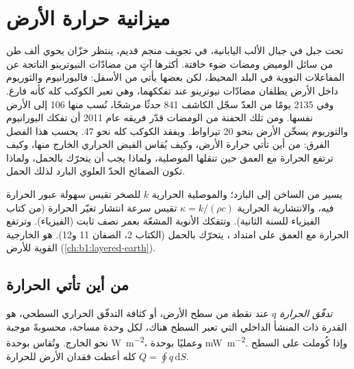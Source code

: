 \chapter{ميزانية حرارة الأرض}\label{ch:b1:heat-budget}

تحت جبل في جبال الألب اليابانية، في تجويف منجم قديم، ينتظر خزّان يحوي ألف طن من سائل الوميض ومضات ضوء خافتة. أكثرها آتٍ من مضادّات النيوترينو الناتجة عن المفاعلات النووية في البلد المحيط، لكن بعضها يأتي من الأسفل: فاليورانيوم والثوريوم داخل الأرض يطلقان مضادّات نيوترينو عند تفككهما، وهي تعبر الكوكب كله كأنه فارغ. وفي 2135 يومًا من العدّ سجّل الكاشف 841 حدثًا مرشحًا، نُسب منها 106 إلى الأرض نفسها. ومن تلك الحفنة من الومضات قدّر فريقه عام 2011 أن تفكك اليورانيوم والثوريوم يسخّن الأرض بنحو 20 تيراواط. ويفقد الكوكب كله نحو 47. يحسب هذا الفصل الفرق: من أين تأتي حرارة الأرض، وكيف يُقاس الفيض الحراري الخارج منها، وكيف ترتفع الحرارة مع العمق حين تنقلها الموصلية، ولماذا يجب أن يتحرّك  بالحمل، ولماذا تكون الصفائح الحدّ العلوي البارد لذلك الحمل.

\begin{recall}
يسير  من الساخن إلى البارد؛ والموصلية الحرارية $k$ للصخر تقيس سهولة عبور الحرارة فيه، والانتشارية الحرارية $\kappa = k/(\rho c)$ تقيس سرعة انتشار تغيّر الحرارة (من كتاب الفيزياء للسنة الثانية). وتتفكك الأنوية المشعّة بعمر نصف ثابت (الفيزياء). وترتفع الحرارة مع العمق على امتداد ،  يتحرّك بالحمل (الكتاب 2، الصفان 11 و\num{12}).  هو  الخارجية القوية للأرض (\cref{ch:b1:layered-earth}).
\end{recall}

\section{من أين تأتي الحرارة}

\begin{definition}\label{def:b1:heat-budget:heat-flow}
\emph{تدفّق الحرارة} $q$ عند نقطة من سطح الأرض، أو كثافة التدفّق الحراري السطحي، هو القدرة ذات المنشأ الداخلي التي تعبر السطح هناك، لكل وحدة مساحة، محسوبةً موجبة نحو الخارج. وتُقاس بوحدة \unit{W.m^{-2}}، وعمليًا بوحدة \unit{mW.m^{-2}}. وإذا كُوملت على السطح كله أعطت فقدان الأرض للحرارة $Q = \oint q\,\mathrm dS$.
\end{definition}

